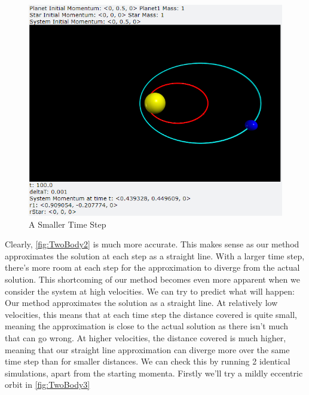 \documentclass[12pt]{article}
\begin{document}
\begin{enumerate}
        \begin{figure}[h]
            \begin{center}
               \includegraphics[scale=.5]{TwoBody2.png}
               \caption{A Smaller Time Step}
               \label{fig:TwoBody2}
            \end{center}
        \end{figure}
        \noindent
        Clearly, \autoref{fig:TwoBody2} is much more accurate. This makes sense as our method approximates the 
        solution at each step as a straight line. With a larger time step, there's more room at each step 
        for the approximation to diverge from the actual solution. This shortcoming of our method becomes 
        even more apparent when we consider the system at high velocities. We can try to predict what will 
        happen: \newline
        Our method approximates the solution as a straight line. At relatively low velocities, this means 
        that at each time step the distance covered is quite small, meaning the approximation is close 
        to the actual solution as there isn't much that can go wrong. At higher velocities, the distance 
        covered is much higher, meaning that our straight line approximation can diverge more over the same 
        time step than for smaller distances. We can check this by running 2 identical simulations, apart 
        from the starting momenta. Firstly we'll try a mildly eccentric orbit in \autoref{fig:TwoBody3}


\end{enumerate}
\end{document}
